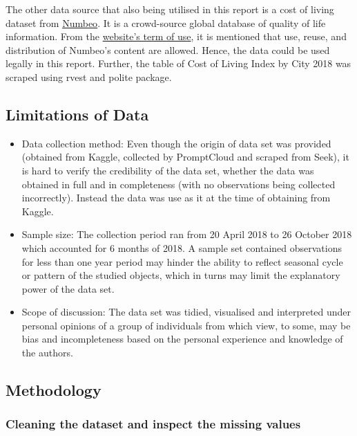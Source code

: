 \documentclass[11pt,a4paper,]{article}
\providecommand{\tightlist}{%
  \setlength{\itemsep}{0pt}\setlength{\parskip}{0pt}}
\begin{document}
The other data source that also being utilised in this report is a cost of living dataset from \href{https://www.numbeo.com/cost-of-living/rankings.jsp?title=2018}{Numbeo}. It is a crowd-source global database of quality of life information. From the \href{https://www.numbeo.com/common/terms_of_use.jsp}{website's term of use}, it is mentioned that use, reuse, and distribution of Numbeo's content are allowed. Hence, the data could be used legally in this report. Further, the table of Cost of Living Index by City 2018 was scraped using rvest and polite package.

\hypertarget{limitations-of-data}{%
\subsection{Limitations of Data}\label{limitations-of-data}}

\begin{itemize}
\tightlist
\item
  Data collection method: Even though the origin of data set was provided (obtained from Kaggle, collected by PromptCloud and scraped from Seek), it is hard to verify the credibility of the data set, whether the data was obtained in full and in completeness (with no observations being collected incorrectly). Instead the data was use as it at the time of obtaining from Kaggle.
\item
  Sample size: The collection period ran from 20 April 2018 to 26 October 2018 which accounted for 6 months of 2018. A sample set contained observations for less than one year period may hinder the ability to reflect seasonal cycle or pattern of the studied objects, which in turns may limit the explanatory power of the data set.\\
\item
  Scope of discussion: The data set was tidied, visualised and interpreted under personal opinions of a group of individuals from which view, to some, may be bias and incompleteness based on the personal experience and knowledge of the authors.
\end{itemize}

\hypertarget{methodology}{%
\subsection{Methodology}\label{methodology}}

\hypertarget{cleaning-the-dataset-and-inspect-the-missing-values}{%
\subsubsection{Cleaning the dataset and inspect the missing values}\label{cleaning-the-dataset-and-inspect-the-missing-values}}
\end{document}
